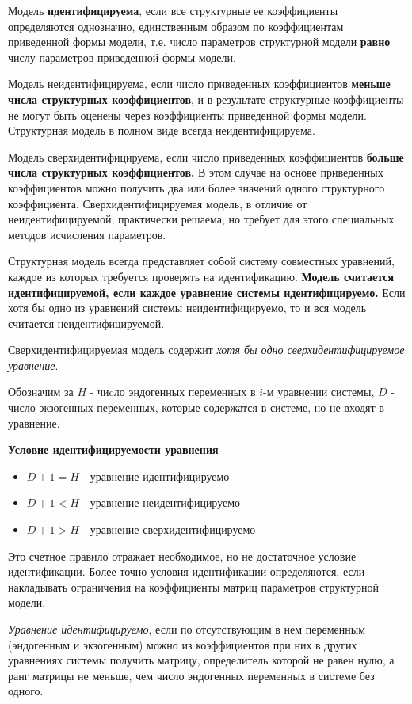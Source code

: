 \documentclass[aps,%
12pt,%
final,%
oneside,
onecolumn,%
musixtex, %
superscriptaddress,%
centertags]{article} %
\theoremstyle{plain}
\theoremstyle{definition}
\theoremstyle{remark}
\begin{document}
Модель \textbf{идентифицируема}, если все структурные ее коэффициенты определяются однозначно, единственным образом по коэффициентам приведенной формы модели, т.е. число параметров структурной модели \textbf{равно} числу параметров приведенной формы модели.

Модель неидентифицируема, если число приведенных коэффициентов \textbf{меньше числа структурных коэффициентов}, и в результате структурные коэффициенты не могут быть оценены через коэффициенты приведенной формы модели. Структурная модель в полном виде всегда неидентифицируема.

Модель сверхидентифицируема, если число приведенных коэффициентов \textbf{больше числа структурных коэффициентов.} В этом случае на основе приведенных коэффициентов можно получить два или более значений одного структурного коэффициента. Сверхидентифицируемая модель, в отличие от неидентифицируемой, практически решаема, но требует для этого специальных методов исчисления параметров.

Структурная модель всегда представляет собой систему совместных уравнений, каждое из которых требуется проверять на идентификацию. \textbf{Модель считается идентифицируемой, если каждое уравнение системы идентифицируемо.} Если хотя бы одно из уравнений системы неидентифицируемо, то и вся модель считается неидентифицируемой. 

Сверхидентифицируемая модель содержит \textit{хотя бы одно сверхидентифицируемое уравнение}.

Обозначим за $H$ - чиcло эндогенных переменных в $i$-м уравнении системы, $D$ - число экзогенных переменных, которые содержатся в системе, но не входят в уравнение. 

\textbf{Условие идентифицируемости уравнения}

\begin{itemize}
	\item $D+1 = H$ - уравнение идентифицируемо
	\item $D+1 < H$ - уравнение неидентифицируемо
	\item $D+1 > H$ - уравнение сверхидентифицируемо
\end{itemize}

Это счетное правило отражает необходимое, но не достаточное условие идентификации. Более точно условия идентификации определяются, если накладывать ограничения на коэффициенты матриц параметров структурной модели. 

\textit{Уравнение идентифицируемо}, если по отсутствующим в нем переменным (эндогенным и экзогенным) можно из коэффициентов при них в других уравнениях системы получить матрицу, определитель которой не равен нулю, а ранг матрицы не меньше, чем число эндогенных переменных в системе без одного.
\end{document}
